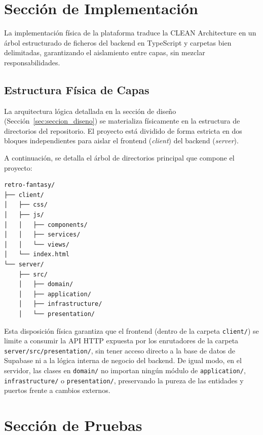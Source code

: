 \section{Sección de Implementación}
\label{sec:seccion_implementacion}

La implementación física de la plataforma traduce la CLEAN Architecture en un árbol estructurado de ficheros del backend en TypeScript y carpetas bien delimitadas, garantizando el aislamiento entre capas, sin mezclar responsabilidades.

\subsection{Estructura Física de Capas}
La arquitectura lógica detallada en la sección de diseño (Sección~\ref{sec:seccion_diseno}) se materializa físicamente en la estructura de directorios del repositorio. El proyecto está dividido de forma estricta en dos bloques independientes para aislar el frontend (\textit{client}) del backend (\textit{server}).

A continuación, se detalla el árbol de directorios principal que compone el proyecto:

\begin{lstlisting}[language=bash, caption={Estructura de directorios física del repositorio de Retro Fantasy.}, label={lst:directory_tree}]
retro-fantasy/
├── client/                
│   ├── css/                
│   ├── js/                
│   │   ├── components/     
│   │   ├── services/      
│   │   └── views/         
│   └── index.html          
└── server/                 
    ├── src/
    │   ├── domain/        
    │   ├── application/   
    │   ├── infrastructure/ 
    │   └── presentation/   
\end{lstlisting}

Esta disposición física garantiza que el frontend (dentro de la carpeta \texttt{client/}) se limite a consumir la API HTTP expuesta por los enrutadores de la carpeta \texttt{server/src/presentation/}, sin tener acceso directo a la base de datos de Supabase ni a la lógica interna de negocio del backend. De igual modo, en el servidor, las clases en \texttt{domain/} no importan ningún módulo de \texttt{application/}, \texttt{infrastructure/} o \texttt{presentation/}, preservando la pureza de las entidades y puertos frente a cambios externos.


\section{Sección de Pruebas}
\label{sec:seccion_pruebas}

